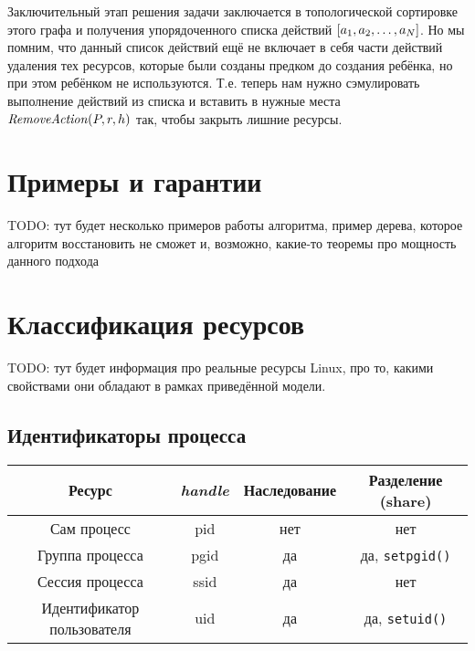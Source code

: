 Заключительный этап решения задачи заключается в топологической сортировке этого графа и получения упорядоченного списка действий $\left[ a_1, a_2, \ldots, a_{N} \right]$. Но мы помним, что данный список действий ещё не включает в себя части действий удаления тех ресурсов, которые были созданы предком до создания ребёнка, но при этом ребёнком не используются. Т.е. теперь нам нужно сэмулировать выполнение действий из списка и вставить в нужные места $\text{\textit{RemoveAction}}(P, r, h)$ так, чтобы закрыть лишние ресурсы.

\section{Примеры и гарантии}

TODO: тут будет несколько примеров работы алгоритма, пример дерева, которое алгоритм восстановить не сможет и, возможно, какие-то теоремы про мощность данного подхода

\section{Классификация ресурсов}

TODO: тут будет информация про реальные ресурсы Linux, про то, какими свойствами они обладают в рамках приведённой модели.

\subsection{Идентификаторы процесса}

\begin{table}[ht!]
\centering
\begin{tabular}{|c|c|c|c|}
	\hline
	\textbf{Ресурс} & \textit{\textbf{handle}} & \textbf{Наследование} & \textbf{Разделение (share)} \\
	\hline
	\hline
	Сам процесс & pid & нет & нет \\
	\hline
	Группа процесса & pgid & да & да, \texttt{setpgid()} \\
	\hline
	Сессия процесса & ssid & да & нет \\
	\hline
	Идентификатор пользователя & uid & да & да, \texttt{setuid()} \\
	\hline
\end{tabular}
\end{table}

